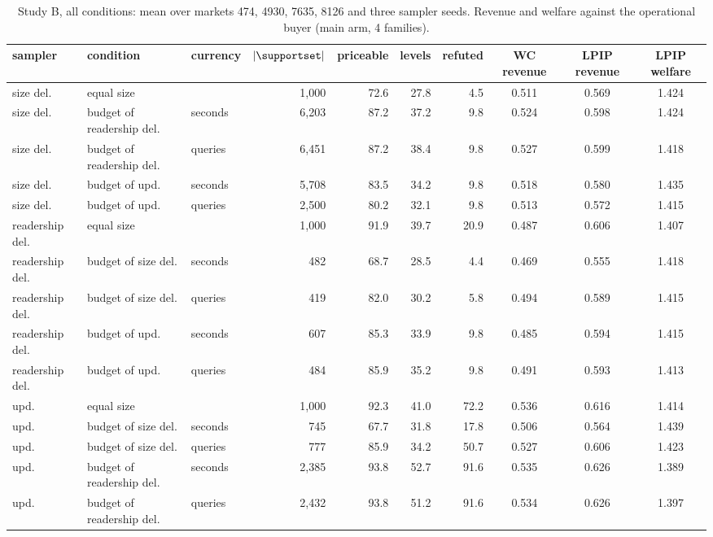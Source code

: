 
\begin{table}[tp]
  \centering
  \footnotesize
  \caption{Study B, all conditions: mean over markets 474, 4930, 7635, 8126 and three sampler seeds. Revenue and welfare against the operational buyer (main arm, 4 families).}
  \label{tab:app-studyB}
  \begin{tabular}{@{}lllrrrrccc@{}}
    \toprule
    sampler & condition & currency & $|\supportset|$ & priceable & levels & refuted & WC revenue & LPIP revenue & LPIP welfare \\
    \midrule
    size del. & equal size &  & 1,000 & 72.6 & 27.8 & 4.5 & 0.511 & 0.569 & 1.424 \\
    size del. & budget of readership del. & seconds & 6,203 & 87.2 & 37.2 & 9.8 & 0.524 & 0.598 & 1.424 \\
    size del. & budget of readership del. & queries & 6,451 & 87.2 & 38.4 & 9.8 & 0.527 & 0.599 & 1.418 \\
    size del. & budget of \qirana{} upd. & seconds & 5,708 & 83.5 & 34.2 & 9.8 & 0.518 & 0.580 & 1.435 \\
    size del. & budget of \qirana{} upd. & queries & 2,500 & 80.2 & 32.1 & 9.8 & 0.513 & 0.572 & 1.415 \\
    \midrule
    readership del. & equal size &  & 1,000 & 91.9 & 39.7 & 20.9 & 0.487 & 0.606 & 1.407 \\
    readership del. & budget of size del. & seconds & 482 & 68.7 & 28.5 & 4.4 & 0.469 & 0.555 & 1.418 \\
    readership del. & budget of size del. & queries & 419 & 82.0 & 30.2 & 5.8 & 0.494 & 0.589 & 1.415 \\
    readership del. & budget of \qirana{} upd. & seconds & 607 & 85.3 & 33.9 & 9.8 & 0.485 & 0.594 & 1.415 \\
    readership del. & budget of \qirana{} upd. & queries & 484 & 85.9 & 35.2 & 9.8 & 0.491 & 0.593 & 1.413 \\
    \midrule
    \qirana{} upd. & equal size &  & 1,000 & 92.3 & 41.0 & 72.2 & 0.536 & 0.616 & 1.414 \\
    \qirana{} upd. & budget of size del. & seconds & 745 & 67.7 & 31.8 & 17.8 & 0.506 & 0.564 & 1.439 \\
    \qirana{} upd. & budget of size del. & queries & 777 & 85.9 & 34.2 & 50.7 & 0.527 & 0.606 & 1.423 \\
    \qirana{} upd. & budget of readership del. & seconds & 2,385 & 93.8 & 52.7 & 91.6 & 0.535 & 0.626 & 1.389 \\
    \qirana{} upd. & budget of readership del. & queries & 2,432 & 93.8 & 51.2 & 91.6 & 0.534 & 0.626 & 1.397 \\
    \bottomrule
  \end{tabular}
\end{table}

